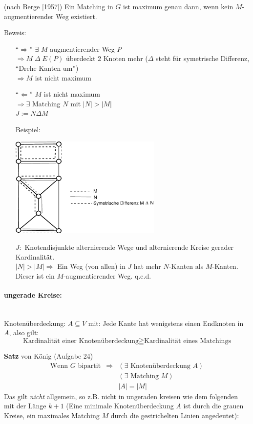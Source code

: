 \begin{satz}
(nach Berge [1957]) Ein Matching in $G$ ist maximum genau dann, wenn kein
$M$-augmentierender Weg existiert.
\end{satz}
Beweis:
\begin{itemize}
\item["`$\Rightarrow$"'] $\exists$ $M$-augmentierender Weg $P$\\
$\Rightarrow M \; \Delta \; E(P)$ überdeckt 2 Knoten mehr ($\Delta$ steht
für symetrische Differenz, "`Drehe Kanten um"')\\
$\Rightarrow M$ ist nicht maximum
\item["`$\Leftarrow$"'] $M$ ist nicht maximum\\
$\Rightarrow \exists$ Matching $N$ mit $|N| > |M|$\\
$J:= N \Delta M$

Beispiel:

\includegraphics[height=5cm]{bilder/5-1DiffMatch}

$J:$ Knotendisjunkte alternierende Wege und alternierende Kreise gerader
Kardinalität.\\
$|N| > |M| \Rightarrow$ Ein Weg (von allen) in $J$ hat mehr $N$-Kanten als
$M$-Kanten. Dieser ist ein $M$-augmentierender Weg. q.e.d.

\end{itemize}

\paragraph{ungerade Kreise:}\mbox{}\\
Knotenüberdeckung: $A \subseteq V$ mit: Jede Kante hat wenigstens einen
Endknoten in $A$, also gilt:
\[\mbox{Kardinalität einer Knotenüberdeckung} \geqq \mbox{Kardinalität eines
Matchings}\] 

{\bf Satz} von König (Aufgabe 24)
\[\begin{array}{rcl}
\mbox{Wenn $G$ bipartit} &\Rightarrow& (\exists \mbox{ Knotenüberdeckung }
A)\\
&& ( \exists \mbox{ Matching } M)\\
&&|A| = | M|
\end{array}
\]
Das gilt {\em nicht} allgemein, so z.B. nicht in ungeraden kreisen wie dem
folgenden mit der Länge $k+1$ (Eine
minimale Knotenüberdeckung $A$ ist durch die grauen Kreise, ein 
maximales Matching $M$ durch die gestrichelten Linien angedeutet):

